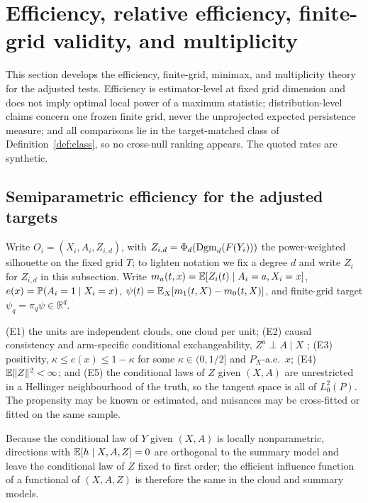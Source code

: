 \section{Efficiency, relative efficiency, finite-grid validity, and multiplicity}
\label{sec:theory-efficiency}

This section develops the efficiency, finite-grid, minimax, and multiplicity theory for the adjusted tests. Efficiency is estimator-level at fixed grid dimension and does not imply optimal local power of a maximum statistic; distribution-level claims concern one frozen finite grid, never the unprojected expected persistence measure; and all comparisons lie in the target-matched class of Definition~\ref{def:class}, so no cross-null ranking appears. The quoted rates are synthetic.

\subsection{Semiparametric efficiency for the adjusted targets}
\label{subsec:eff}

Write $O_i=(X_i,A_i,Z_{i,d})$, with $Z_{i,d}=\Phi_d(\mathrm{Dgm}_d(F(Y_i)))$ the power-weighted silhouette on the fixed grid $T$; to lighten notation we fix a degree $d$ and write $Z_i$ for $Z_{i,d}$ in this subsection. Write $m_a(t,x)=\mathbb{E}[Z_i(t)\mid A_i=a,X_i=x]$, $e(x)=\mathbb{P}(A_i=1\mid X_i=x)$, $\psi(t)=\mathbb{E}_X[m_1(t,X)-m_0(t,X)]$, and finite-grid target $\psi_q=\pi_q\psi\in\mathbb R^q$.

\begin{assumption}
\label{ass:eff-model}
(E1) the units are independent clouds, one cloud per unit; (E2) causal consistency and arm-specific conditional exchangeability, $Z^a\perp A\mid X$ \cite{souto_diamantis_tcda_2026,kim_lee_tce_2026}; (E3) positivity, $\kappa\le e(x)\le1-\kappa$ for some $\kappa\in(0,1/2]$ and $P_X$-a.e.\ $x$; (E4) $\mathbb{E}\lVert Z\rVert^2<\infty$; and (E5) the conditional laws of $Z$ given $(X,A)$ are unrestricted in a Hellinger neighbourhood of the truth, so the tangent space is all of $L^2_0(P)$. The propensity may be known or estimated, and nuisances may be cross-fitted or fitted on the same sample.
\end{assumption}

Because the conditional law of $Y$ given $(X,A)$ is locally nonparametric, directions with $\mathbb{E}[h\mid X,A,Z]=0$ are orthogonal to the summary model and leave the conditional law of $Z$ fixed to first order; the efficient influence function of a functional of $(X,A,Z)$ is therefore the same in the cloud and summary models.

